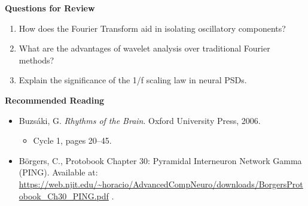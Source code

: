 \textbf{Questions for Review}
\begin{enumerate}
\item How does the Fourier Transform aid in isolating oscillatory components?
\item What are the advantages of wavelet analysis over traditional Fourier methods?
\item Explain the significance of the 1/f scaling law in neural PSDs.
\end{enumerate}

\textbf{Recommended Reading}
\begin{itemize}
\item Buzsáki, G. \textit{Rhythms of the Brain}. Oxford University Press, 2006.  \cite{buzsaki2006rhythms}
    \begin{itemize}
        \item Cycle 1, pages 20–45.
    \end{itemize}
\item Börgers, C., Protobook Chapter 30: Pyramidal Interneuron Network Gamma (PING). Available at: \url{https://web.njit.edu/~horacio/AdvancedCompNeuro/downloads/BorgersProtobook_Ch30_PING.pdf} \cite{borgers_ping}.
\end{itemize}
